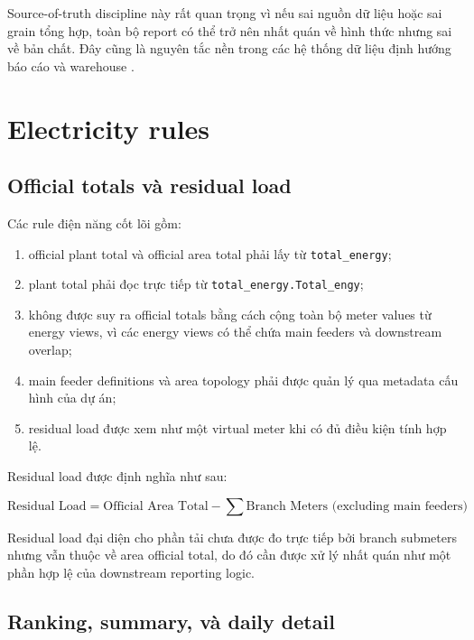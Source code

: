 Source-of-truth discipline này rất quan trọng vì nếu sai nguồn dữ liệu hoặc sai grain tổng hợp, toàn bộ report có thể trở nên nhất quán về hình thức nhưng sai về bản chất. Đây cũng là nguyên tắc nền trong các hệ thống dữ liệu định hướng báo cáo và warehouse \cite{ref_kimball,ref_mysql}.

\section{Electricity rules}

\subsection{Official totals và residual load}

Các rule điện năng cốt lõi gồm:

\begin{enumerate}[label=-]
\item official plant total và official area total phải lấy từ \texttt{total\_energy};
\item plant total phải đọc trực tiếp từ \texttt{total\_energy.Total\_engy};
\item không được suy ra official totals bằng cách cộng toàn bộ meter values từ energy views, vì các energy views có thể chứa main feeders và downstream overlap;
\item main feeder definitions và area topology phải được quản lý qua metadata cấu hình của dự án;
\item residual load được xem như một virtual meter khi có đủ điều kiện tính hợp lệ.
\end{enumerate}

Residual load được định nghĩa như sau:

\begin{equation}
	\text{Residual Load} = \text{Official Area Total} - \sum \text{Branch Meters (excluding main feeders)}
	\label{eq:residual_load}
\end{equation}

Residual load đại diện cho phần tải chưa được đo trực tiếp bởi branch submeters nhưng vẫn thuộc về area official total, do đó cần được xử lý nhất quán như một phần hợp lệ của downstream reporting logic.

\subsection{Ranking, summary, và daily detail}

